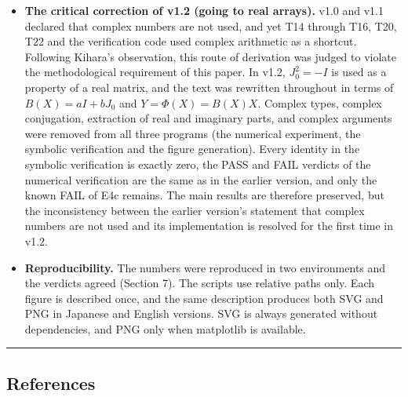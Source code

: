 \documentclass[
  a4paper,
]{article}
\begin{document}
\begin{itemize}
  \(X\) with one revolution of the readout position \(Y\) (one
  revolution of \(X\) is two of \(Y\), so the clock sum of E4b is twice
  the Kepler period); (2) A.20 did not make explicit the double root of
  the second-order rule in the parabolic type; (3) Section 9 listed T17
  among the candidates for novelty while admitting that it may overlap
  with the known correspondence of conserved quantities; (4) the
  operational explanation of the mass ratio in C4 was too strong; (5)
  Section 11 wrote ``either'' for three conditions. The main theorems
  and the numerical data are unchanged.
\item
  \textbf{The critical correction of v1.2 (going to real arrays).} v1.0
  and v1.1 declared that complex numbers are not used, and yet T14
  through T16, T20, T22 and the verification code used complex
  arithmetic as a shortcut. Following Kihara's observation, this route
  of derivation was judged to violate the methodological requirement of
  this paper. In v1.2, \(J_0^2=-I\) is used as a property of a real
  matrix, and the text was rewritten throughout in terms of
  \(B(X)=aI+bJ_0\) and \(Y=\Phi(X)=B(X)X\). Complex types, complex
  conjugation, extraction of real and imaginary parts, and complex
  arguments were removed from all three programs (the numerical
  experiment, the symbolic verification and the figure generation).
  Every identity in the symbolic verification is exactly zero, the PASS
  and FAIL verdicts of the numerical verification are the same as in the
  earlier version, and only the known FAIL of E4c remains. The main
  results are therefore preserved, but the inconsistency between the
  earlier version's statement that complex numbers are not used and its
  implementation is resolved for the first time in v1.2.
\item
  \textbf{Reproducibility.} The numbers were reproduced in two
  environments and the verdicts agreed (Section 7). The scripts use
  relative paths only. Each figure is described once, and the same
  description produces both SVG and PNG in Japanese and English
  versions. SVG is always generated without dependencies, and PNG only
  when matplotlib is available.
\end{itemize}

\begin{center}\rule{0.5\linewidth}{0.5pt}\end{center}

\subsection{References}\label{references}
\end{document}
